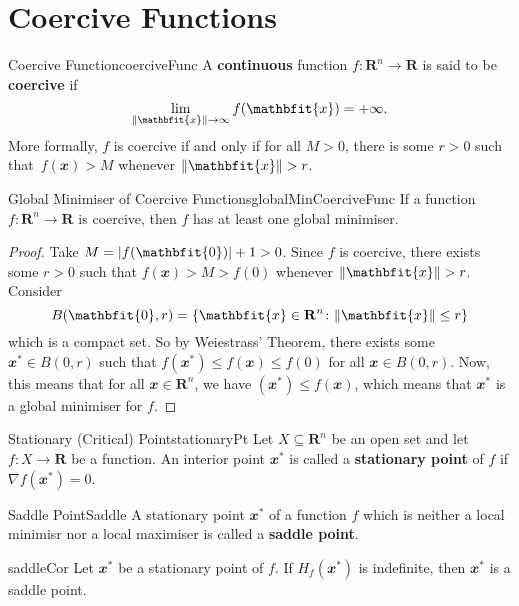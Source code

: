 \documentclass[math]{amznotes}
\theoremstyle{remark}
\begin{document}
\section{Coercive Functions}
\begin{dfnbox}{Coercive Function}{coerciveFunc}
    A {\color{red} \textbf{continuous}} function $f \colon \mathbf{R}^n \to \mathbf{R}$ is said to be {\color{red} \textbf{coercive}} if
    \begin{equation*}
        \lim_{\norm{\mathbfit{x}} \to \infty} f(\mathbfit{x}) = +\infty.
    \end{equation*}
    More formally, $f$ is coercive if and only if for all $M > 0$, there is some $r > 0$ such that~$f(\mathbfit{x}) > M$ whenever $\norm{\mathbfit{x}} > r$.
\end{dfnbox}
\begin{thmbox}{Global Minimiser of Coercive Functions}{globalMinCoerciveFunc}
    If a function $f \colon \mathbf{R}^n \to \mathbf{R}$ is coercive, then $f$ has at least one global minimiser.
    \tcblower   
    \begin{proof}
        Take $M = \abs{f(\mathbfit{0})} + 1 > 0$. Since $f$ is coercive, there exists some $r > 0$ such that $f(\mathbfit{x}) > M > f(\mathbfit{0})$ whenever $\norm{\mathbfit{x}} > r$. Consider
        \begin{displaymath}
            B(\mathbfit{0}, r) = \left\{\mathbfit{x} \in \mathbf{R}^n \colon \norm{\mathbfit{x}} \leq r\right\}
        \end{displaymath}
        which is a compact set. So by Weiestrass' Theorem, there exists some $\mathbfit{x}^* \in B(\mathbfit{0}, r)$ such that $f(\mathbfit{x}^*) \leq f(\mathbfit{x}) \leq f(\mathbfit{0})$ for all $\mathbfit{x} \in B(\mathbfit{0}, r)$. Now, this means that for all $\mathbfit{x} \in \mathbf{R}^n$, we have $(\mathbfit{x}^*) \leq f(\mathbfit{x})$, which means that $\mathbfit{x}^*$ is a global minimiser for $f$.
    \end{proof}
\end{thmbox}
\begin{dfnbox}{Stationary (Critical) Point}{stationaryPt}
    Let $X \subseteq \mathbf{R}^n$ be an open set and let $f \colon X \to \mathbf{R}$ be a function. An interior point $\mathbfit{x}^*$ is called a {\color{red} \textbf{stationary point}} of $f$ if $\nabla f(\mathbfit{x}^*) = \mathbfit{0}$.
\end{dfnbox}
\begin{dfnbox}{Saddle Point}{Saddle}
    A stationary point $\mathbfit{x}^*$ of a function $f$ which is neither a local minimisr nor a local maximiser is called a {\color{red} \textbf{saddle point}}.
\end{dfnbox}
\begin{corbox}{}{saddleCor}
    Let $\mathbfit{x}^*$ be a stationary point of $f$. If $H_f(\mathbfit{x}^*)$ is indefinite, then $\mathbfit{x}^*$ is a saddle point.
\end{corbox}
\end{document}
